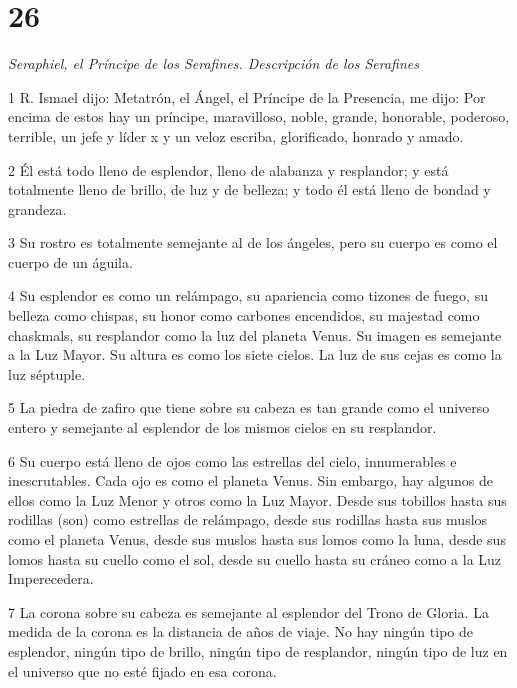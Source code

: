 \chapter{26}

\par \textit{Seraphiel, el Príncipe de los Serafines. Descripción de los Serafines}

\par 1 R. Ismael dijo: Metatrón, el Ángel, el Príncipe de la Presencia, me dijo: Por encima de estos hay un príncipe, maravilloso, noble, grande, honorable, poderoso, terrible, un jefe y líder x y un veloz escriba, glorificado, honrado y amado.

\par 2 Él está todo lleno de esplendor, lleno de alabanza y resplandor; y está totalmente lleno de brillo, de luz y de belleza; y todo él está lleno de bondad y grandeza.

\par 3 Su rostro es totalmente semejante al de los ángeles, pero su cuerpo es como el cuerpo de un águila.

\par 4 Su esplendor es como un relámpago, su apariencia como tizones de fuego, su belleza como chispas, su honor como carbones encendidos, su majestad como chaskmals, su resplandor como la luz del planeta Venus. Su imagen es semejante a la Luz Mayor. Su altura es como los siete cielos. La luz de sus cejas es como la luz séptuple.

\par 5 La piedra de zafiro que tiene sobre su cabeza es tan grande como el universo entero y semejante al esplendor de los mismos cielos en su resplandor.

\par 6 Su ​​cuerpo está lleno de ojos como las estrellas del cielo, innumerables e inescrutables. Cada ojo es como el planeta Venus. Sin embargo, hay algunos de ellos como la Luz Menor y otros como la Luz Mayor. Desde sus tobillos hasta sus rodillas (son) como estrellas de relámpago, desde sus rodillas hasta sus muslos como el planeta Venus, desde sus muslos hasta sus lomos como la luna, desde sus lomos hasta su cuello como el sol, desde su cuello hasta su cráneo como a la Luz Imperecedera.

\par 7 La corona sobre su cabeza es semejante al esplendor del Trono de Gloria. La medida de la corona es la distancia de años de viaje. No hay ningún tipo de esplendor, ningún tipo de brillo, ningún tipo de resplandor, ningún tipo de luz en el universo que no esté fijado en esa corona.

